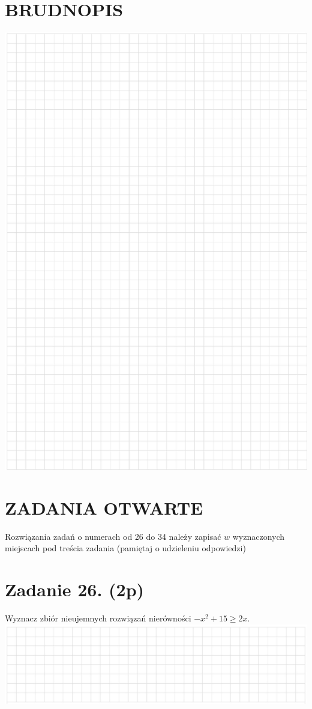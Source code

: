 \documentclass[10pt]{article}
\begin{document}
\section*{BRUDNOPIS}
\begin{center}
\includegraphics[max width=\textwidth]{2024_11_21_b63ac6eb3d78a57ac924g-08}
\end{center}

\section*{ZADANIA OTWARTE}
Rozwiązania zadań o numerach od 26 do 34 należy zapisać \(w\) wyznaczonych miejscach pod treścia zadania (pamiętaj o udzieleniu odpowiedzi)

\section*{Zadanie 26. (2p)}
Wyznacz zbiór nieujemnych rozwiązań nierówności \(-x^{2}+15 \geq 2 x\).\\
\includegraphics[max width=\textwidth, center]{2024_11_21_b63ac6eb3d78a57ac924g-09}
\end{document}

